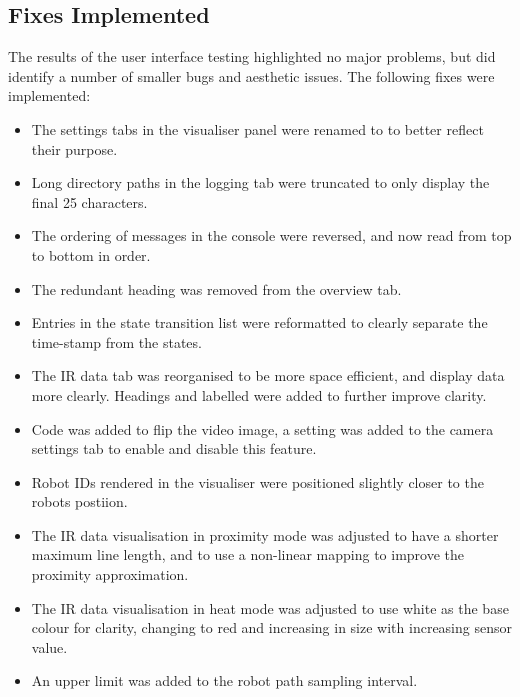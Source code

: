 \subsection{Fixes Implemented}
The results of the user interface testing highlighted no major problems, but did identify a number of smaller bugs and aesthetic issues. The following fixes were implemented:

\begin{itemize}
 \item The settings tabs in the visualiser panel were renamed to to better reflect their purpose.
 \item Long directory paths in the logging tab were truncated to only display the final 25 characters.
 \item The ordering of messages in the console were reversed, and now read from top to bottom in order.
 \item The redundant heading was removed from the overview tab.
 \item Entries in the state transition list were reformatted to clearly separate the time-stamp from the states.
 \item The IR data tab was reorganised to be more space efficient, and display data more clearly. Headings and labelled were added to further improve clarity.
 \item Code was added to flip the video image, a setting was added to the camera settings tab to enable and disable this feature.
 \item Robot IDs rendered in the visualiser were positioned slightly closer to the robots postiion.
 \item The IR data visualisation in proximity mode was adjusted to have a shorter maximum line length, and to use a non-linear mapping to improve the proximity approximation.
 \item The IR data visualisation in heat mode was adjusted to use white as the base colour for clarity, changing to red and increasing in size with increasing sensor value.
 \item An upper limit was added to the robot path sampling interval.
\end{itemize}


